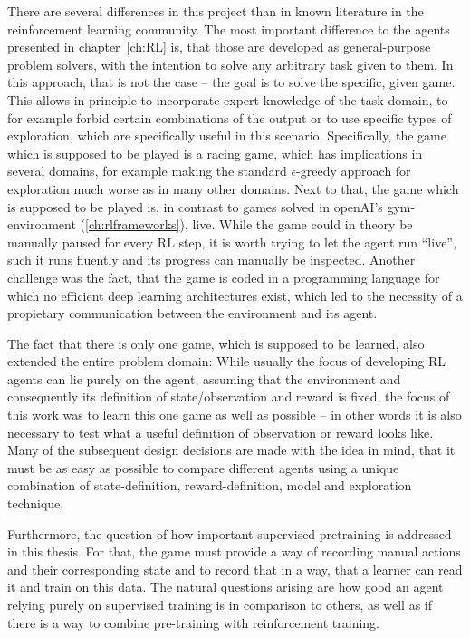 There are several differences in this project than in known literature in the reinforcement learning community. The most important difference to the agents presented in chapter~\ref{ch:RL} is, that those are developed as general-purpose problem solvers, with the intention to solve any arbitrary task given to them. In this approach, that is not the case -- the goal is to solve the specific, given game. This allows in principle to incorporate expert knowledge of the task domain, to for example forbid certain combinations of the output or to use specific types of exploration, which are specifically useful in this scenario. Specifically, the game which is supposed to be played is a racing game, which has implications in several domains, for example making the standard $\epsilon$-greedy approach for exploration much worse as in many other domains. Next to that, the game which is supposed to be played is, in contrast to games solved in openAI's gym-environment (\ref{ch:rlframeworks}), live. While the game could in theory be manually paused for every RL step, it is worth trying to let the agent run ``live'', such it runs fluently and its progress can manually be inspected. Another challenge was the fact, that the game is coded in a programming language for which no efficient deep learning architectures exist, which led to the necessity of a propietary communication between the environment and its agent.

The fact that there is only one game, which is supposed to be learned, also extended the entire problem domain: While usually the focus of developing RL agents can lie purely on the agent, assuming that the environment and consequently its definition of state/observation and reward is fixed, the focus of this work was to learn this one game as well as possible -- in other words it is also necessary to test what a useful definition of observation or reward looks like. Many of the subsequent design decisions are made with the idea in mind, that it must be as easy as possible to compare different agents using a unique combination of state-definition, reward-definition, model and exploration technique. 

Furthermore, the question of how important supervised pretraining is addressed in this thesis. For that, the game must provide a way of recording manual actions and their corresponding state and to record that in a way, that a learner can read it and train on this data. The natural questions arising are how good an agent relying purely on supervised training is in comparison to others, as well as if there is a way to combine pre-training with reinforcement training.

